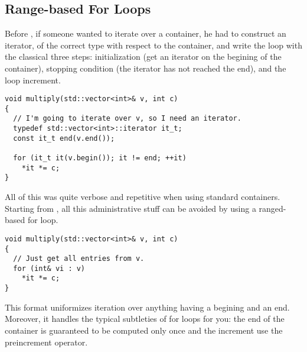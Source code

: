 \subsection{Range-based For Loops}
\label{range-based-for-loops}

Before , if someone wanted to iterate over a container, he had
to construct an iterator, of the correct type with respect to the
container, and write the loop with the classical three steps:
initialization (get an iterator on the begining of the container),
stopping condition (the iterator has not reached the end), and the
loop increment.

\begin{lstlisting}
void multiply(std::vector<int>& v, int c)
{
  // I'm going to iterate over v, so I need an iterator.
  typedef std::vector<int>::iterator it_t;
  const it_t end(v.end());

  for (it_t it(v.begin()); it != end; ++it)
    *it *= c;
}
\end{lstlisting}

All of this was quite verbose and repetitive when using standard
containers. Starting from , all this administrative stuff can be
avoided by using a ranged-based for loop.

\begin{lstlisting}
void multiply(std::vector<int>& v, int c)
{
  // Just get all entries from v.
  for (int& vi : v)
    *it *= c;
}
\end{lstlisting}

This format uniformizes iteration over anything having a begining and
an end. Moreover, it handles the typical subtleties of for loops for
you: the end of the container is guaranteed to be computed only once
and the increment use the preincrement operator.
